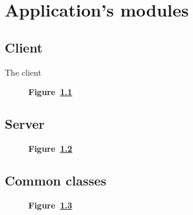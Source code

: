 \chapter{Application's modules}\label{ch:modules}

\begin{landscape}
	\section{Client}\label{sec:client}
    The client
	\begin{figure}[!h]
		\caption*{\textbf{Figure~\ref{fig:client}}}
		\captionlistentry{}
		\label{fig:client}
	\end{figure}
\end{landscape}

\begin{landscape}
	\section{Server}\label{sec:server}

	\begin{figure}[!h]
		\caption*{\textbf{Figure~\ref{fig:server}}}
		\captionlistentry{}
		\label{fig:server}
	\end{figure}
\end{landscape}

\begin{landscape}
	\section{Common classes}\label{sec:common}

	\begin{figure}[!h]
		\caption*{\textbf{Figure~\ref{fig:common}}}
		\captionlistentry{}
		\label{fig:common}
	\end{figure}
\end{landscape}
